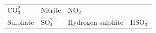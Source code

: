 {\begin{tabular}[t]{|l|l|l|l|}
    
        \begin{math}\mathrm{CO}_{3}^{2-}\end{math} &
    
    
        Nitrite &
    
    
        \begin{math}\mathrm{NO}_{2}^{-}\end{math}%
     \tabularnewline\cline{1-1}\cline{2-2}\cline{3-3}\cline{4-4}
    
    
        Sulphate &
    
    
        \begin{math}\mathrm{SO}_{4}^{2-}\end{math} &
    
    
        Hydrogen sulphite &
    
    
        \begin{math}\mathrm{HSO}_{3}^{-}\end{math}%
     \tabularnewline\cline{1-1}\cline{2-2}\cline{3-3}\cline{4-4}
    

\end{tabular}}
